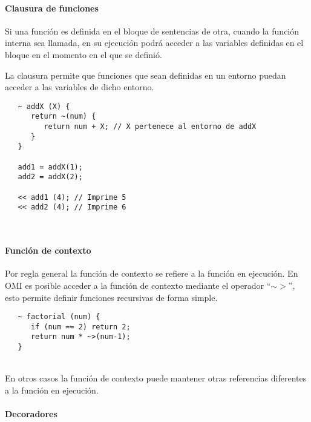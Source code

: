 \paragraph{Clausura de funciones}
Si una función es definida en el bloque de sentencias de otra, cuando la función interna sea llamada, en su ejecución podrá 
acceder a las variables definidas en el bloque en el momento en el que se definió.

La clausura permite que funciones que sean definidas en un entorno puedan acceder a las variables de dicho entorno. \\

\begin{lstlisting}
   ~ addX (X) { 
      return ~(num) {
         return num + X; // X pertenece al entorno de addX
      }
   }
   
   add1 = addX(1);
   add2 = addX(2);
   
   << add1 (4); // Imprime 5
   << add2 (4); // Imprime 6
\end{lstlisting}
\hfill\\ 

\paragraph{Función de contexto}
Por regla general la función de contexto se refiere a la función en ejecución. En OMI es 
posible acceder a la función de contexto mediante el operador ``$\sim>$'', esto permite definir 
funciones recursivas de forma simple. \\

\begin{lstlisting}
   ~ factorial (num) {
      if (num == 2) return 2;
      return num * ~>(num-1);
   }
\end{lstlisting}
\hfill\\ 

En otros casos la función de contexto puede mantener otras referencias diferentes a la función 
en ejecución.

\paragraph{Decoradores}


